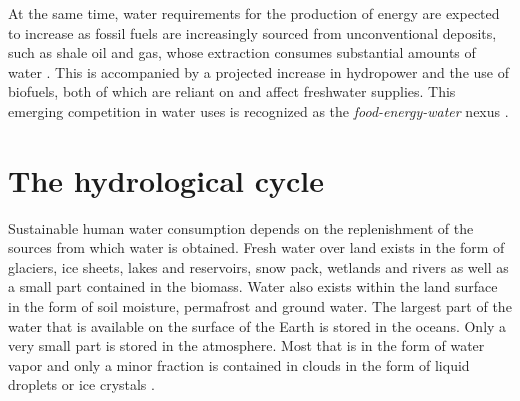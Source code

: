 At the same time, water requirements for the production of energy are expected
to increase as fossil fuels are increasingly sourced from unconventional
deposits, such as shale oil and gas, whose extraction consumes substantial
amounts of water \citep{rosa18}. This is accompanied by a projected increase in
hydropower \citep{zarfl15} and the use of biofuels, both of which are reliant on
and affect freshwater supplies. This emerging competition in water uses is
recognized as the \textit{food-energy-water} nexus \citep{dodorico18}.



%
%


\section{The hydrological cycle}

Sustainable human water consumption depends on the replenishment of the sources
from which water is obtained. Fresh water over land exists in the form of
glaciers, ice sheets, lakes and reservoirs, snow pack, wetlands and rivers as
well as a small part contained in the biomass. Water also exists within the land
surface in the form of soil moisture, permafrost and ground water. The largest
part of the water that is available on the surface of the Earth is stored in the
oceans. Only a very small part is stored in the atmosphere. Most that is in
the form of water vapor and only a minor fraction is contained in clouds in the
form of liquid droplets or ice crystals \citep{abbott19}.

